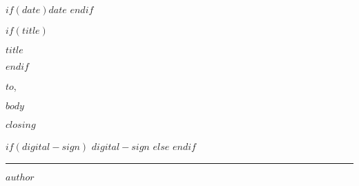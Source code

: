 \documentclass[a4paper, 11pt]{letter}
\date{}
\begin{document}
\begin{letter}{}

  $if(date)$\hfill $date$ \vspace{1em}$endif$

  $if(title)${\begin{center} $title$ \end{center}}$endif$

  \opening{$to$,}

  \pagestyle{fancy}
  \thispagestyle{fancy}

  \vspace{3em}

  \hspace{1.5cm}
  $body$

  \vspace{3em}
  \hspace{1.5cm} $closing$
  \vspace{1em}

  \hfill
  \begin{minipage}{0.5\linewidth}

    $if(digital-sign)$
    $digital-sign$
    $else$
    \vspace{3em}
    $endif$

    \begin{flushright}
      \rule{\textwidth}{0.5pt}

      $author$
    \end{flushright}

  \end{minipage}

  \vfill

\end{letter}
\end{document}

